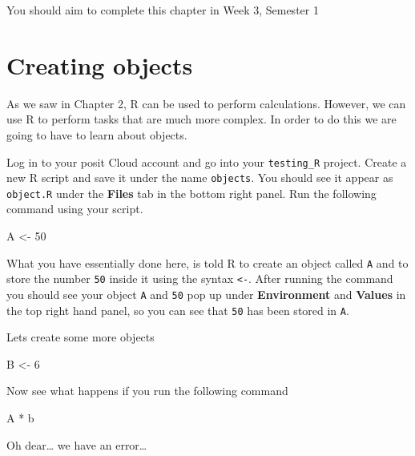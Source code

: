 \documentclass[
]{book}
\newenvironment{Shaded}{\begin{snugshade}}{\end{snugshade}}
\newcommand{\DecValTok}[1]{\textcolor[rgb]{0.00,0.00,0.81}{#1}}
\newcommand{\NormalTok}[1]{#1}
\newcommand{\OtherTok}[1]{\textcolor[rgb]{0.56,0.35,0.01}{#1}}
\newcommand{\SpecialCharTok}[1]{\textcolor[rgb]{0.00,0.00,0.00}{#1}}
\begin{document}
You should aim to complete this chapter in Week 3, Semester 1

\hypertarget{creating-objects}{%
\section{Creating objects}\label{creating-objects}}

As we saw in Chapter 2, R can be used to perform calculations. However, we can use R to perform tasks that are much more complex. In order to do this we are going to have to learn about objects.

Log in to your posit Cloud account and go into your \texttt{testing\_R} project. Create a new R script and save it under the name \texttt{objects}. You should see it appear as \texttt{object.R} under the \textbf{Files} tab in the bottom right panel. Run the following command using your script.

\begin{Shaded}
\begin{Highlighting}[]
\NormalTok{A }\OtherTok{\textless{}{-}} \DecValTok{50}
\end{Highlighting}
\end{Shaded}

What you have essentially done here, is told R to create an object called \texttt{A} and to store the number \texttt{50} inside it using the syntax \texttt{\textless{}-}. After running the command you should see your object \texttt{A} and \texttt{50} pop up under \textbf{Environment} and \textbf{Values} in the top right hand panel, so you can see that \texttt{50} has been stored in \texttt{A}.

Lets create some more objects

\begin{Shaded}
\begin{Highlighting}[]
\NormalTok{B }\OtherTok{\textless{}{-}} \DecValTok{6}
\end{Highlighting}
\end{Shaded}

Now see what happens if you run the following command

\begin{Shaded}
\begin{Highlighting}[]
\NormalTok{A }\SpecialCharTok{*}\NormalTok{ b}
\end{Highlighting}
\end{Shaded}

Oh dear\ldots{} we have an error\ldots{}
\end{document}

